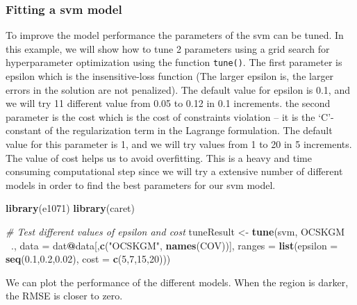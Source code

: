 \documentclass[10pt,b5paper,]{book}
\newenvironment{Shaded}{\begin{snugshade}}{\end{snugshade}}
\newcommand{\CommentTok}[1]{\textcolor[rgb]{0.56,0.35,0.01}{\textit{#1}}}
\newcommand{\DataTypeTok}[1]{\textcolor[rgb]{0.13,0.29,0.53}{#1}}
\newcommand{\DecValTok}[1]{\textcolor[rgb]{0.00,0.00,0.81}{#1}}
\newcommand{\FloatTok}[1]{\textcolor[rgb]{0.00,0.00,0.81}{#1}}
\newcommand{\KeywordTok}[1]{\textcolor[rgb]{0.13,0.29,0.53}{\textbf{#1}}}
\newcommand{\NormalTok}[1]{#1}
\newcommand{\OperatorTok}[1]{\textcolor[rgb]{0.81,0.36,0.00}{\textbf{#1}}}
\newcommand{\StringTok}[1]{\textcolor[rgb]{0.31,0.60,0.02}{#1}}
\theoremstyle{definition}
\theoremstyle{definition}
\theoremstyle{definition}
\theoremstyle{remark}
\begin{document}
\hypertarget{fitting-a-svm-model}{%
\subsubsection{Fitting a svm model}\label{fitting-a-svm-model}}

To improve the model performance the parameters of the svm can be tuned.
In this example, we will show how to tune 2 parameters using a grid
search for hyperparameter optimization using the function
\texttt{tune()}. The first parameter is epsilon which is the
insensitive-loss function (The larger epsilon is, the larger errors in
the solution are not penalized). The default value for epsilon is 0.1,
and we will try 11 different value from 0.05 to 0.12 in 0.1 increments.
the second parameter is the cost which is the cost of constraints
violation -- it is the `C'-constant of the regularization term in the
Lagrange formulation. The default value for this parameter is 1, and we
will try values from 1 to 20 in 5 increments. The value of cost helps us
to avoid overfitting. This is a heavy and time consuming computational
step since we will try a extensive number of different models in order
to find the best parameters for our svm model.

\begin{Shaded}
\begin{Highlighting}[]
\KeywordTok{library}\NormalTok{(e1071)}
\KeywordTok{library}\NormalTok{(caret)}

\CommentTok{#  Test different values of epsilon and cost}
\NormalTok{  tuneResult <-}\StringTok{ }\KeywordTok{tune}\NormalTok{(svm, OCSKGM }\OperatorTok{~}\NormalTok{.,  }\DataTypeTok{data =}\NormalTok{ dat}\OperatorTok{@}\NormalTok{data[,}\KeywordTok{c}\NormalTok{(}\StringTok{"OCSKGM"}\NormalTok{,}
                                                         \KeywordTok{names}\NormalTok{(COV))],}
                     \DataTypeTok{ranges =} \KeywordTok{list}\NormalTok{(}\DataTypeTok{epsilon =} \KeywordTok{seq}\NormalTok{(}\FloatTok{0.1}\NormalTok{,}\FloatTok{0.2}\NormalTok{,}\FloatTok{0.02}\NormalTok{),}
                                   \DataTypeTok{cost =} \KeywordTok{c}\NormalTok{(}\DecValTok{5}\NormalTok{,}\DecValTok{7}\NormalTok{,}\DecValTok{15}\NormalTok{,}\DecValTok{20}\NormalTok{)))}
\end{Highlighting}
\end{Shaded}

We can plot the performance of the different models. When the region is
darker, the RMSE is closer to zero.
\end{document}
